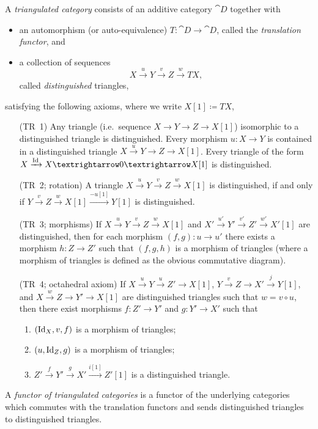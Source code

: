 \documentclass[english]{short-notes}
\begin{document}
\begin{Def}
    A \emph{triangulated category} consists of an additive category $\cat D$ together with
    \begin{itemize}
        \item an automorphism (or auto-equivalence) $T\colon \cat D → \cat D$, called the \emph{translation functor}, and
        \item a collection of sequences
            \[ X \xrightarrow{u} Y \xrightarrow{v} Z \xrightarrow{w} TX, \]
            called \emph{distinguished} triangles,
    \end{itemize}
    satisfying the following axioms, where we write $X[1] \coloneq TX$,
        \begin{enumerate}
            \item[(TR~1)]
                Any triangle (i.e.\ sequence $X → Y → Z → X[1]$) isomorphic to a distinguished triangle is distinguished.
                Every morphism $u\colon X → Y$ is contained in a distinguished triangle $X \xrightarrow{u} Y → Z → X[1]$.
                Every triangle of the form $X \xrightarrow{\id} X → 0 → X[1]$ is distinguished.
            \item[(TR~2; rotation)]
                A triangle $X \xrightarrow{u} Y \xrightarrow{v} Z \xrightarrow{w} X[1]$ is distinguished, if and only if $Y \xrightarrow{v} Z \xrightarrow{w} X[1] \xrightarrow{-u[1]} Y[1]$ is distinguished.
            \item[(TR~3; morphisms)] 
                If $X \xrightarrow{u} Y \xrightarrow{v} Z \xrightarrow{w} X[1]$ and
                $X' \xrightarrow{u'} Y' \xrightarrow{v'} Z' \xrightarrow{w'} X'[1]$
                are distinguished, then for each morphism $(f,g)\colon u → u'$ there exists a morphism $h\colon Z → Z'$ such that $(f,g,h)$ is a morphism of triangles (where a morphism of triangles is defined as the obvious commutative diagram).
            \item[(TR~4; octahedral axiom)]
                If $X \xrightarrow{u} Y \xrightarrow{u} Z' → X[1]$,
                $Y \xrightarrow{v} Z \xrightarrow{} X' \xrightarrow{j} Y[1]$, and
                $X \xrightarrow{w} Z \xrightarrow{} Y' \xrightarrow{} X[1]$
                are distinguished triangles such that $w = v∘u$, then there exist morphisms $f\colon Z' → Y'$ and $g\colon Y' → X'$ such that
                \begin{enumerate}[1)]
                    \item $(\id[X],v,f)$ is a morphism of triangles;
                    \item $(u, \id[Z],g)$ is a morphism of triangles;
                    \item $Z' \xrightarrow{f} Y' \xrightarrow{g} X' \xrightarrow{i[1]} Z'[1]$ is a distinguished triangle.
                \end{enumerate}
    \end{enumerate}
    A \emph{functor of triangulated categories} is a functor of the underlying categories which commutes with the translation functors and sends distinguished triangles to distinguished triangles.
\end{Def}
\end{document}
